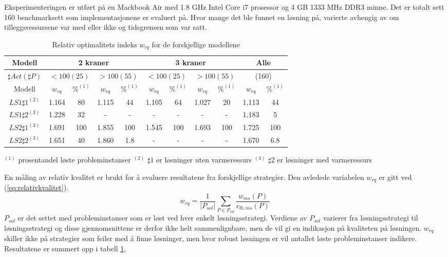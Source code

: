 Eksperimenteringen er utført på en Mackbook Air med 1.8 GHz Intel Core i7 prosessor og 4 GB 1333 MHz DDR3 minne. Det er totalt sett 160 benchmarksett som implementasjonene er evaluert på. Hvor mange det ble funnet en løsning på, varierte avhengig av om tilleggsressursene var med eller ikke og tidsgrensen som var satt.

\begin{table}[h]
\begin{center}
\begin{tabular}{ | c | c | c | c | c | c | c | c | c | c | c | }
\hline
\textbf{Modell} & \multicolumn{4}{|c|}{\textbf{2 kraner}} & \multicolumn{4}{|c|}{\textbf{3 kraner}} & \multicolumn{2}{|c|}{\textbf{Alle}} \\ \hline
$\sharp Act(\sharp P)$ & \multicolumn{2}{|c|}{$< 100 (25)$} & \multicolumn{2}{|c|}{$> 100 (55)$} & \multicolumn{2}{|c|}{$< 100 (25)$} & \multicolumn{2}{|c|}{$> 100 (55)$} & \multicolumn{2}{|c|}{(160)} \\ 
\hline
Modell & $w_{rq}$ & $\%^{(1)}$ & $w_{rq}$ & $\%^{(1)}$  & $w_{rq}$ & $\%^{(1)}$ & $w_{rq}$ & $\%^{(1)}$ & $w_{rq}$ & $\%^{(1)}$ \\ \hline
$LS1 \sharp 1^{(2)}$ & 1.164 & 80 & 1.115 & 44 & 1.105 & 64 & 1.027 & 20 & 1.113 & 44 \\
$LS1 \sharp 2^{(3)}$ & 1.228 & 32 & - & - & - & - & - & - & 1.183 & 5 \\
$LS2 \sharp 1^{(2)}$ & 1.691 & 100 & 1.855 & 100 & 1.545 & 100 & 1.693 & 100 & 1.725 & 100 \\
$LS2 \sharp 2^{(3)}$ & 1.651 & 40 & 1.860 & 1.8 & - & - & - & - & 1.670 & 6.8 \\
\hline
\end{tabular}
\end{center}
\caption{Relativ optimalitets indeks $w_{rq}$ for de forskjellige modellene}
\label{tab:resultaterSum}
\end{table}
$^{(1)}$ prosentandel løste probleminstanser
$^{(2)}$ $\sharp 1$ er løsninger uten varmeressurs
$^{(3)}$ $\sharp 2$ er løsninger med varmeressurs

En måling av relativ kvalitet er brukt for å evaluere resultatene fra forskjellige strategier. Den avledede variabelen $w_{rq}$ er gitt ved (\ref{eq:relativkvalitet}).
\begin{equation}
w_{rq} = \frac{1}{| P_{sol} |} \sum_{P \in P_{sol}} \frac{w_{ms}(P)}{c_{lb,ms}(P)}
\label{eq:relativkvalitet}
\end{equation}
$P_{sol}$ er det settet med probleminstanser som er løst ved hver enkelt løsningsstrategi. Verdiene av $P_{sol}$ varierer fra løsningsstrategi til løsningsstrategi og disse gjennomsnittene er derfor ikke helt sammenlignbare, men de vil gi en indikasjon på kvaliteten på løsningen. $w_{rq}$ skiller ikke på strategier som feiler med å finne løsninger, men hvor robust løsningen er vil antallet løste probleminstanser indikere. Resultatene er summert opp i tabell \ref{tab:resultaterSum}.

